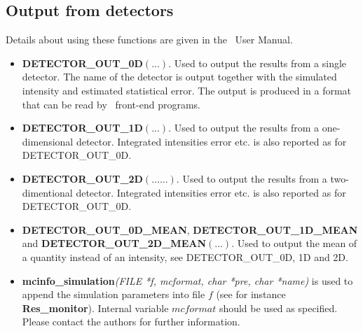 \subsection{Output from detectors}
Details about using these functions are given in the \MCX\ User Manual.
\begin{itemize}
\item {\bfseries DETECTOR\_OUT\_0D}$(...)$. Used to output the results from a
  single detector. The name of the detector is output together
  with the simulated intensity and estimated statistical error. The
  output is produced in a format that can be read by \MCX\ front-end
  programs.
\item {\bfseries DETECTOR\_OUT\_1D}$(...)$. Used to output the results from a
  one-dimensional detector. Integrated intensities error etc. is also
  reported as for DETECTOR\_OUT\_0D.
\item {\bfseries DETECTOR\_OUT\_2D}$(\dots...)$. Used to output the results from a
  two-dimentional detector. Integrated intensities error etc. is also
  reported as for DETECTOR\_OUT\_0D.
\item {\bfseries DETECTOR\_OUT\_0D\_MEAN}, {\bfseries DETECTOR\_OUT\_1D\_MEAN} and {\bfseries DETECTOR\_OUT\_2D\_MEAN}$(...)$. Used to output
  the mean of a quantity instead of an intensity, see DETECTOR\_OUT\_0D, 1D and 2D.
\item {\bfseries mcinfo\_simulation}\textit{(FILE *f, mcformat,
  char *pre, char *name)} is used to append the simulation parameters into file $f$
  (see for instance {\bfseries Res\_monitor}).
  Internal variable $mcformat$ should be used as specified.
  Please contact the authors for further information.
\end{itemize}


